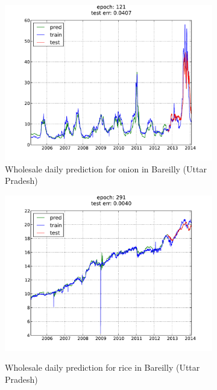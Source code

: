 \begin{figure}[H]
        \begin{subfigure}[b]{.45\linewidth}
        \centering
        \includegraphics[width=\textwidth]{img/ffnn/3.pdf}
        \caption{Wholesale daily prediction for onion in Bareilly (Uttar Pradesh)}
        \label{subfig:ffnn_pred_3}
        \end{subfigure}
        \quad
        \begin{subfigure}[b]{.45\linewidth}
        \centering
        \includegraphics[width=\textwidth]{img/ffnn/4.pdf}
        \label{subfig:ffnn_pred_4}
        \caption{Wholesale daily prediction for rice in Bareilly (Uttar Pradesh)}
        \end{subfigure}
        \begin{subfigure}[b]{.45\linewidth}

\end{subfigure}
\end{figure}
